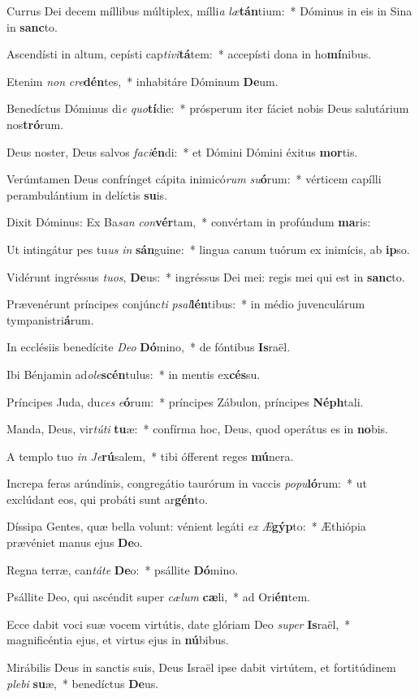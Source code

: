 \item Currus Dei decem míllibus múltiplex, mílli\textit{a} \textit{læ}\textbf{tán}tium:~* Dóminus in eis in Sina in \textbf{sanc}to.
\item Ascendísti in altum, cepísti cap\textit{ti}\textit{vi}\textbf{tá}tem:~* accepísti dona in ho\textbf{mí}nibus.
\item Etenim \textit{non} \textit{cre}\textbf{dén}tes,~* inhabitáre Dóminum \textbf{De}um.
\item Benedíctus Dóminus di\textit{e} \textit{quo}\textbf{tí}die:~* prósperum iter fáciet nobis Deus salutárium nos\textbf{tró}rum.
\item Deus noster, Deus salvos \textit{fa}\textit{ci}\textbf{én}di:~* et Dómini Dómini éxitus \textbf{mor}tis.
\item Verúmtamen Deus confrínget cápita inimicó\textit{rum} \textit{su}\textbf{ó}rum:~* vérticem capílli perambulántium in delíctis \textbf{su}is.
\item Dixit Dóminus: Ex Ba\textit{san} \textit{con}\textbf{vér}tam,~* convértam in profúndum \textbf{ma}ris:
\item Ut intingátur pes tu\textit{us} \textit{in} \textbf{sán}guine:~* lingua canum tuórum ex inimícis, ab \textbf{ip}so.
\item Vidérunt ingréssus \textit{tu}\textit{os}, \textbf{De}us:~* ingréssus Dei mei: regis mei qui est in \textbf{sanc}to.
\item Prævenérunt príncipes conjúnc\textit{ti} \textit{psal}\textbf{lén}tibus:~* in médio juvenculárum tympanistri\textbf{á}rum.
\item In ecclésiis benedícite \textit{De}\textit{o} \textbf{Dó}mino,~* de fóntibus \textbf{Is}raël.
\item Ibi Bénjamin ad\textit{o}\textit{le}\textbf{scén}tulus:~* in mentis ex\textbf{cés}su.
\item Príncipes Juda, du\textit{ces} \textit{e}\textbf{ó}rum:~* príncipes Zábulon, príncipes \textbf{Néph}tali.
\item Manda, Deus, vir\textit{tú}\textit{ti} \textbf{tu}æ:~* confírma hoc, Deus, quod operátus es in \textbf{no}bis.
\item A templo tuo \textit{in} \textit{Je}\textbf{rú}salem,~* tibi ófferent reges \textbf{mú}nera.
\item Increpa feras arúndinis, congregátio taurórum in vaccis \textit{po}\textit{pu}\textbf{ló}rum:~* ut exclúdant eos, qui probáti sunt ar\textbf{gén}to.
\item Díssipa Gentes, quæ bella volunt: vénient legáti \textit{ex} \textit{Æ}\textbf{gýp}to:~* Æthiópia prævéniet manus ejus \textbf{De}o.
\item Regna terræ, can\textit{tá}\textit{te} \textbf{De}o:~* psállite \textbf{Dó}mino.
\item Psállite Deo, qui ascéndit super \textit{cæ}\textit{lum} \textbf{cæ}li,~* ad Ori\textbf{én}tem.
\item Ecce dabit voci suæ vocem virtútis, date glóriam Deo \textit{su}\textit{per} \textbf{Is}raël,~* magnificéntia ejus, et virtus ejus in \textbf{nú}bibus.
\item Mirábilis Deus in sanctis suis, Deus Israël ipse dabit virtútem, et fortitúdinem \textit{ple}\textit{bi} \textbf{su}æ,~* benedíctus \textbf{De}us.
